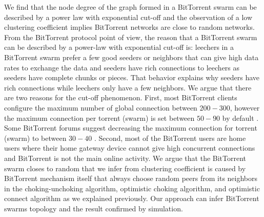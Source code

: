 We find that the node degree of the graph formed in a BitTorrent swarm can be described by a power law with exponential cut-off and the observation of a low clustering coefficient implies BitTorrent networks are close to random networks.
From the BitTorrent protocol point of view, the reason that a BitTorrent swarm can be described by a power-law with exponential cut-off is: leechers in a BitTorrent swarm prefer a few good seeders or neighbors that can give high data rates to exchange the data and seeders have rich connections to leechers as seeders have complete chunks or pieces. 
That behavior explains why seeders have rich connections while leechers only have a few neighbors. 
We argue that there are two reasons for the cut-off phenomenon. 
First, most BitTorrent clients configure the maximum number of global connection between $200-300$, however the maximum connection per torrent (swarm) is set between $50 - 90$ by default \cite{clientv}\cite{clientu}.
Some BitTorrent forums suggest decreasing the maximum connection for torrent (swarm) to between $30-40$ \cite{clientf}. 
Second, most of the BitTorrent users are home users where their home gateway device cannot give high concurrent connections and BitTorrent is not the main online activity. 
We argue that the BitTorrent swarm closes to random that we infer from clustering coefficient is caused by BitTorrent mechanism itself that always choose random peers from its neighbors in the choking-unchoking algorithm, optimistic choking algorithm, and optimistic connect algorithm as we explained previously.
Our approach can infer BitTorrent swarms topology and the result confirmed by simulation.

